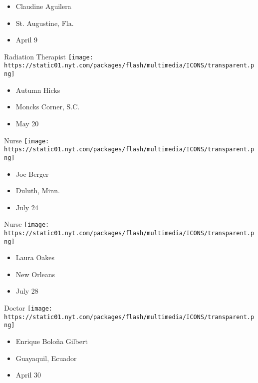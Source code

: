 \begin{itemize}
\tightlist
\item
  Claudine Aguilera
\item
  St. Augustine, Fla.
\item
  April 9
\end{itemize}

\protect\hyperlink{item-autumn-hicks}{}

Radiation Therapist
\texttt{[image: https://static01.nyt.com/packages/flash/multimedia/ICONS/transparent.png]}

\begin{itemize}
\tightlist
\item
  Autumn Hicks
\item
  Moncks Corner, S.C.
\item
  May 20
\end{itemize}

\protect\hyperlink{item-joe-berger}{}

Nurse
\texttt{[image: https://static01.nyt.com/packages/flash/multimedia/ICONS/transparent.png]}

\begin{itemize}
\tightlist
\item
  Joe Berger
\item
  Duluth, Minn.
\item
  July 24
\end{itemize}

\protect\hyperlink{item-laura-oakes}{}

Nurse
\texttt{[image: https://static01.nyt.com/packages/flash/multimedia/ICONS/transparent.png]}

\begin{itemize}
\tightlist
\item
  Laura Oakes
\item
  New Orleans
\item
  July 28
\end{itemize}

\protect\hyperlink{item-enrique-bolona-gilbert}{}

Doctor
\texttt{[image: https://static01.nyt.com/packages/flash/multimedia/ICONS/transparent.png]}

\begin{itemize}
\tightlist
\item
  Enrique Boloña Gilbert
\item
  Guayaquil, Ecuador
\item
  April 30
\end{itemize}


